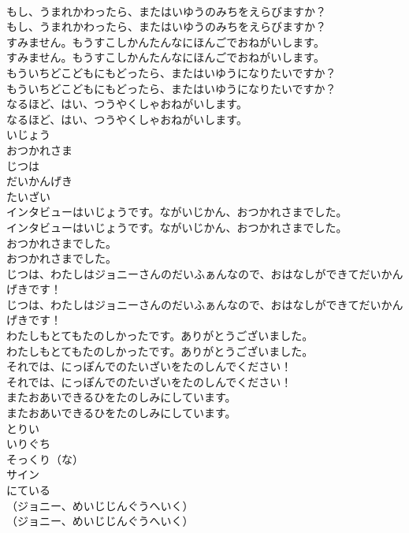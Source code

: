 \documentclass[8pt]{extreport}
\begin{document}
\begin{CJK}{UTF8}{min}
\\	もし、うまれかわったら、またはいゆうのみちをえらびますか？	
\\	もし、うまれかわったら、またはいゆうのみちをえらびますか？ 
\\	すみません。もうすこしかんたんなにほんごでおねがいします。	
\\	すみません。もうすこしかんたんなにほんごでおねがいします。 
\\	もういちどこどもにもどったら、またはいゆうになりたいですか？	
\\	もういちどこどもにもどったら、またはいゆうになりたいですか？ 
\\	なるほど、はい、つうやくしゃおねがいします。	
\\	なるほど、はい、つうやくしゃおねがいします。 
\\	いじょう
\\	おつかれさま
\\	じつは
\\	だいかんげき
\\	たいざい
\\	インタビューはいじょうです。ながいじかん、おつかれさまでした。	
\\	インタビューはいじょうです。ながいじかん、おつかれさまでした。 
\\	おつかれさまでした。	
\\	おつかれさまでした。 
\\	じつは、わたしはジョニーさんのだいふぁんなので、おはなしができてだいかんげきです！	
\\	じつは、わたしはジョニーさんのだいふぁんなので、おはなしができてだいかんげきです！ 
\\	わたしもとてもたのしかったです。ありがとうございました。	
\\	わたしもとてもたのしかったです。ありがとうございました。 
\\	それでは、にっぽんでのたいざいをたのしんでください！	
\\	それでは、にっぽんでのたいざいをたのしんでください！ 
\\	またおあいできるひをたのしみにしています。	
\\	またおあいできるひをたのしみにしています。 
\\	とりい
\\	いりぐち
\\	そっくり（な）
\\	サイン
\\	にている
\\	（ジョニー、めいじじんぐうへいく）	
\\	（ジョニー、めいじじんぐうへいく） 

\end{CJK}
\end{document}
